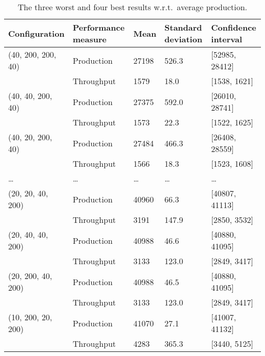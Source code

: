 \documentclass{article}
\begin{document}
\begin{table}[h]
    \begin{tabular}{|p{3cm}|p{2.5cm}|p{1.5cm}|p{1.5cm}|p{3cm}|}
    \hline
    Configuration      & Performance measure & Mean  & Standard deviation & Confidence interval \\ \hline

    (40, 200, 200, 40) & Production          & 27198 & 526.3              & [52985, 28412]      \\ \hline
                       & Throughput          & 1579  & 18.0               & [1538, 1621]        \\ \hline
    (40, 40, 200, 40)  & Production          & 27375 & 592.0              & [26010, 28741]      \\ \hline
                       & Throughput          & 1573  & 22.3               & [1522, 1625]        \\ \hline
    (40, 20, 200, 40)  & Production          & 27484 & 466.3              & [26408, 28559]      \\ \hline
                       & Throughput          & 1566  & 18.3               & [1523, 1608]        \\ \hline
    \dots              & \dots               & \dots & \dots              & \dots               \\ \hline

    (20, 20, 40, 200)  & Production          & 40960 & 66.3               & [40807, 41113]      \\ \hline
                       & Throughput          & 3191  & 147.9              & [2850, 3532]        \\ \hline
    (20, 40, 40, 200)  & Production          & 40988 & 46.6               & [40880, 41095]      \\ \hline
                       & Throughput          & 3133  & 123.0              & [2849, 3417]        \\ \hline

    (20, 200, 40, 200) & Production          & 40988 & 46.5               & [40880, 41095]      \\ \hline
                       & Throughput          & 3133  & 123.0              & [2849, 3417]        \\ \hline
    (10, 200, 20, 200) & Production          & 41070 & 27.1               & [41007, 41132]      \\ \hline
                       & Throughput          & 4283  & 365.3              & [3440, 5125]        \\ \hline
    \end{tabular}
    \caption {The three worst and four best results w.r.t.\ average production.}
    \label{table:results_table}
\end{table}
\end{document}
